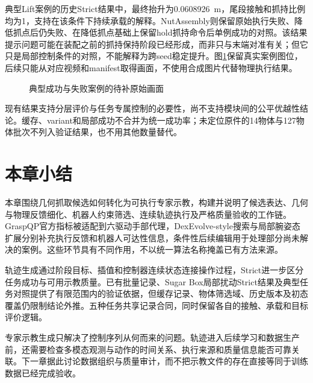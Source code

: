 典型Lift案例的历史Strict结果中，最终抬升为0.0608926~m，尾段接触和抓持比例均为1，支持在该条件下持续承载的解释。NutAssembly则保留原始执行失败、降低抓点后仍失败、在降低抓点基础上保留hold抓持命令后单例成功的对照。该结果提示问题可能在装配之前的抓持保持阶段已经形成，而非只与末端对准有关；但它只是局部控制条件的对照，不能解释为跨seed稳定提升。图\ref{fig:ch03_examples}保留真实案例图位，后续只能从对应视频和manifest取得画面，不使用合成图片代替物理执行结果。

\begin{figure}[htbp]
 \centering
 \caption{典型成功与失败案例的待补原始画面}
 \label{fig:ch03_examples}
\end{figure}

现有结果支持分层评价与任务专属控制的必要性，尚不支持模块间的公平优越性结论。缓存、variant和局部成功不合并为统一成功率；未定位原件的14物体与127物体批次不列入验证结果，也不用其他数量替代。

\section{本章小结}
\label{sec:grasp_demonstration_summary}

本章围绕几何抓取候选如何转化为可执行专家示教，构建并说明了候选表达、几何与物理反馈细化、机器人约束筛选、连续轨迹执行及严格质量验收的工作链。GraspQP官方指标被适配到六驱动手部代理，DexEvolve-style搜索与局部腕姿态扩展分别补充执行反馈和机器人可达性信息，条件性后续编辑用于处理部分尚未解决的案例。这些环节具有不同作用，不以统一算法名称掩盖已有方法来源。

轨迹生成通过阶段目标、插值和控制器连续状态连接操作过程，Strict进一步区分任务成功与可用示教质量。已有批量记录、Sugar Box局部扰动Strict结果及典型任务对照提供了有限范围内的验证依据，但缓存记录、物体筛选域、历史版本及初态覆盖仍限制结论外推。五种任务共享记录合同，同时保留各自的接触、承载和目标评价逻辑。

专家示教生成只解决了控制序列从何而来的问题。轨迹进入后续学习和数据生产前，还需要检查多模态观测与动作的时间关系、执行来源和质量信息能否可靠关联。下一章据此讨论数据组织与质量审计，而不把示教文件的存在直接等同于训练数据已经完成验收。
